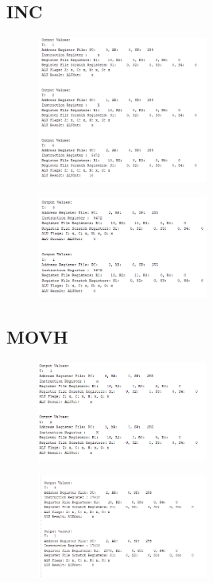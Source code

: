 \documentclass[pdftex,12pt,a4paper]{article}
\begin{document}
\subsection{INC}
\begin{figure}[H]
	\centering
	\includegraphics[width=0.5\textwidth]{inc1.png}	
	\label{fig7}
\end{figure}
\begin{figure}[H]
	\centering
	\includegraphics[width=0.5\textwidth]{inc2.png}	
	\label{fig8}
\end{figure}

\subsection{MOVH}
\begin{figure}[H]
	\centering
	\includegraphics[width=0.5\textwidth]{movh1.png}	
	\label{fig9}
\end{figure}
\begin{figure}[H]
	\centering
	\includegraphics[width=0.5\textwidth]{movh2.png}	
	\label{fig10}
\end{figure}
\end{document}
